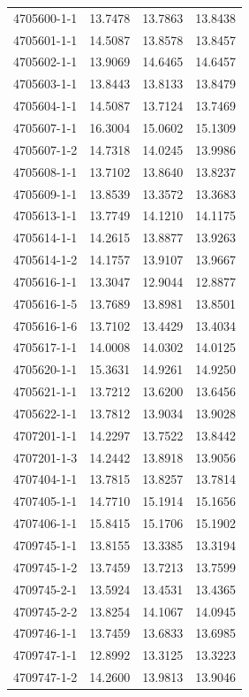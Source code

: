 \begin{longtable}{lrrr}
4705600-1-1 & 13.7478 & 13.7863 & 13.8438 \\
4705601-1-1 & 14.5087 & 13.8578 & 13.8457 \\
4705602-1-1 & 13.9069 & 14.6465 & 14.6457 \\
4705603-1-1 & 13.8443 & 13.8133 & 13.8479 \\
4705604-1-1 & 14.5087 & 13.7124 & 13.7469 \\
4705607-1-1 & 16.3004 & 15.0602 & 15.1309 \\
4705607-1-2 & 14.7318 & 14.0245 & 13.9986 \\
4705608-1-1 & 13.7102 & 13.8640 & 13.8237 \\
4705609-1-1 & 13.8539 & 13.3572 & 13.3683 \\
4705613-1-1 & 13.7749 & 14.1210 & 14.1175 \\
4705614-1-1 & 14.2615 & 13.8877 & 13.9263 \\
4705614-1-2 & 14.1757 & 13.9107 & 13.9667 \\
4705616-1-1 & 13.3047 & 12.9044 & 12.8877 \\
4705616-1-5 & 13.7689 & 13.8981 & 13.8501 \\
4705616-1-6 & 13.7102 & 13.4429 & 13.4034 \\
4705617-1-1 & 14.0008 & 14.0302 & 14.0125 \\
4705620-1-1 & 15.3631 & 14.9261 & 14.9250 \\
4705621-1-1 & 13.7212 & 13.6200 & 13.6456 \\
4705622-1-1 & 13.7812 & 13.9034 & 13.9028 \\
4707201-1-1 & 14.2297 & 13.7522 & 13.8442 \\
4707201-1-3 & 14.2442 & 13.8918 & 13.9056 \\
4707404-1-1 & 13.7815 & 13.8257 & 13.7814 \\
4707405-1-1 & 14.7710 & 15.1914 & 15.1656 \\
4707406-1-1 & 15.8415 & 15.1706 & 15.1902 \\
4709745-1-1 & 13.8155 & 13.3385 & 13.3194 \\
4709745-1-2 & 13.7459 & 13.7213 & 13.7599 \\
4709745-2-1 & 13.5924 & 13.4531 & 13.4365 \\
4709745-2-2 & 13.8254 & 14.1067 & 14.0945 \\
4709746-1-1 & 13.7459 & 13.6833 & 13.6985 \\
4709747-1-1 & 12.8992 & 13.3125 & 13.3223 \\
4709747-1-2 & 14.2600 & 13.9813 & 13.9046 \\

\end{longtable}
